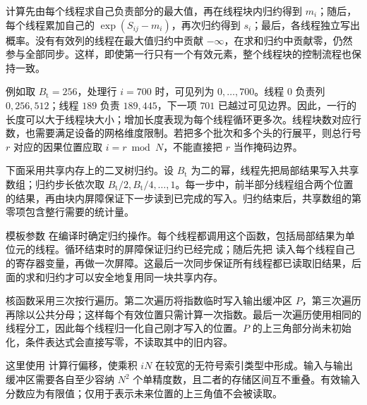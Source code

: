 计算先由每个线程求自己负责部分的最大值，再在线程块内归约得到 $m_i$；随后，每个线程累加自己的 $\exp(S_{ij}-m_i)$，再次归约得到 $s_i$；最后，各线程独立写出概率。没有有效列的线程在最大值归约中贡献 $-\infty$，在求和归约中贡献零，仍然参与全部同步。这样，即使第一行只有一个有效元素，整个线程块的控制流程也保持一致。

例如取 $B_{\mathrm t}=256$，处理行 $i=700$ 时，可见列为 $0,\ldots,700$。线程 $0$ 负责列 $0,256,512$；线程 $189$ 负责 $189,445$，下一项 $701$ 已越过可见边界。因此，一行的长度可以大于线程块大小；增加长度表现为每个线程循环更多次。线程块数对应行数，也需要满足设备的网格维度限制。若把多个批次和多个头的行展平，则总行号 $r$ 对应的因果位置应取 $i=r\bmod N$，不能直接把 $r$ 当作掩码边界。

下面采用共享内存上的二叉树归约。设 $B_{\mathrm t}$ 为二的幂，线程先把局部结果写入共享数组；归约步长依次取 $B_{\mathrm t}/2,B_{\mathrm t}/4,\ldots,1$。每一步中，前半部分线程组合两个位置的结果，再由块内屏障保证下一步读到已完成的写入。归约结束后，共享数组的第零项包含整行需要的统计量。

\noindent\begin{minipage}{\linewidth}

\end{minipage}

模板参数  在编译时确定归约操作。每个线程都调用这个函数，包括局部结果为单位元的线程。循环结束时的屏障保证归约已经完成；随后先把  读入每个线程自己的寄存器变量，再做一次屏障。这最后一次同步保证所有线程都已读取旧结果，后面的求和归约才可以安全地复用同一块共享内存。

核函数采用三次按行遍历。第二次遍历将指数临时写入输出缓冲区 $P$，第三次遍历再除以公共分母；这样每个有效位置只需计算一次指数。最后一次遍历使用相同的线程分工，因此每个线程归一化自己刚才写入的位置。$P$ 的上三角部分尚未初始化，条件表达式会直接写零，不读取其中的旧内容。

\noindent\begin{minipage}{\linewidth}

\end{minipage}

这里使用  计算行偏移，使乘积 $iN$ 在较宽的无符号索引类型中形成。输入与输出缓冲区需要各自至少容纳 $N^2$ 个单精度数，且二者的存储区间互不重叠。有效输入分数应为有限值；仅用于表示未来位置的上三角值不会被读取。

